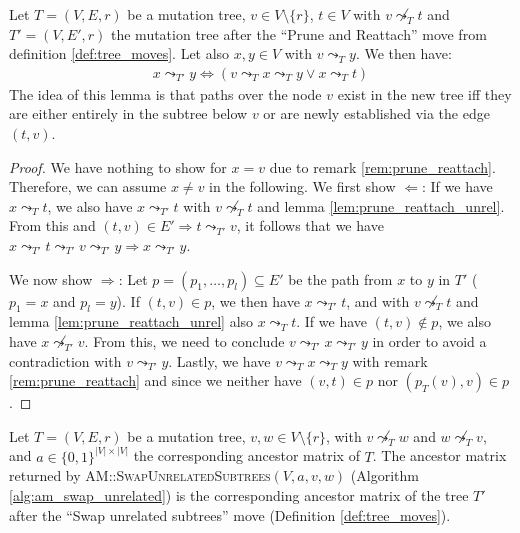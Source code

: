 \begin{lemma}
    \label{lem:prune_reattach_rel}
    Let $T = (V, E, r)$ be a mutation tree, $v \in V \setminus \{r\}$, $t \in V$ with $v \not\leadsto_T t$ and $T' = (V, E', r)$ the mutation tree after the ``Prune and Reattach'' move from definition \ref{def:tree_moves}. Let also $x, y \in V$ with $v \leadsto_T y$. We then have:
    \begin{align*}
        x \leadsto_{T'} y \Leftrightarrow (v \leadsto_T x \leadsto_T y \vee x \leadsto_T t)
    \end{align*}
    The idea of this lemma is that paths over the node $v$ exist in the new tree iff they are either entirely in the subtree below $v$ or are newly established via the edge $(t, v)$.
\end{lemma}

\begin{proof}
    We have nothing to show for $x = v$ due to remark \ref{rem:prune_reattach}. Therefore, we can assume $x \neq v$ in the following. We first show $\Leftarrow$: If we have $x \leadsto_T t$, we also have $x \leadsto_{T'} t$ with $v \not\leadsto_T t$ and lemma \ref{lem:prune_reattach_unrel}. From this and $(t, v) \in E' \Rightarrow t \leadsto_{T'} v$, it follows that we have $x \leadsto_{T'} t \leadsto_{T'} v \leadsto_{T'} y \Rightarrow x \leadsto_{T'} y$.

    We now show $\Rightarrow$: Let $p = (p_1, \dots, p_l) \subseteq E'$ be the path from $x$ to $y$ in $T'$ ($p_1 = x$ and $p_l = y$). If $(t, v) \in p$, we then have $x \leadsto_{T'} t$, and with $v \not\leadsto_T t$ and lemma \ref{lem:prune_reattach_unrel} also $x \leadsto_T t$. If we have $(t, v) \notin p$, we also have $x \not\leadsto_{T'} v$. From this, we need to conclude $v \leadsto_{T'} x \leadsto_{T'} y$ in order to avoid a contradiction with $v \leadsto_{T'} y$. Lastly, we have $v \leadsto_T x \leadsto_T y$ with remark \ref{rem:prune_reattach} and since we neither have $(v, t) \in p$ nor $(p_T(v), v) \in p$.
\end{proof}

\begin{theorem}
    \label{theo:swap_unrelated_correctness}
    Let $T = (V, E, r)$ be a mutation tree, $v,w \in V \setminus \{r\}$, with $v \not\leadsto_T w$ and $w \not\leadsto_T v$, and $a \in \{0,1\}^{|V| \times |V|}$ the corresponding ancestor matrix of $T$. The ancestor matrix returned by \textsc{AM::SwapUnrelatedSubtrees}$(V, a, v, w)$ (Algorithm \ref{alg:am_swap_unrelated}) is the corresponding ancestor matrix of the tree $T'$ after the ``Swap unrelated subtrees'' move (Definition \ref{def:tree_moves}).
\end{theorem}

